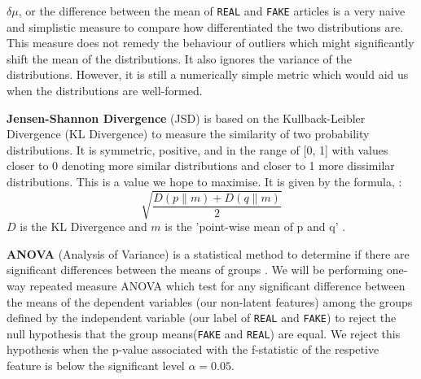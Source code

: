 \documentclass{article}
\begin{document}
\textbf{$\delta \mu$}, or the difference between the mean of \texttt{REAL} and \texttt{FAKE} articles is a very naive and simplistic measure to compare how differentiated the two distributions are. This measure does not remedy the behaviour of outliers which might significantly shift the mean of the distributions. It also ignores the variance of the distributions. However, it is still a numerically simple metric which would aid us when the distributions are well-formed.

\textbf{Jensen-Shannon Divergence} (JSD) is based on the Kullback-Leibler Divergence (KL Divergence) to measure the similarity of two probability distributions. It is symmetric, positive, and in the range of [0, 1] with values closer to 0 denoting more similar distributions and closer to 1 more dissimilar distributions. This is a value we hope to maximise. It is given by the formula, \cite{scipy}:
\[\sqrt{\frac{D(p \parallel m) + D(q \parallel m)}{2}}\]
$D$ is the KL Divergence and $m$ is the 'point-wise mean of p and q' \cite{scipy}.

\textbf{ANOVA} (Analysis of Variance) is a statistical method to determine if there are significant differences between the means of groups \cite{anova}. We will be performing one-way repeated measure ANOVA which test for any significant difference between the means of the dependent variables (our non-latent features) among the groups defined by the independent variable (our label of \texttt{REAL} and \texttt{FAKE}) to reject the null hypothesis that the group means(\texttt{FAKE} and \texttt{REAL}) are equal. We reject this hypothesis when the p-value associated with the f-statistic of the respetive feature is below the significant level $\alpha = 0.05$.
\end{document}
